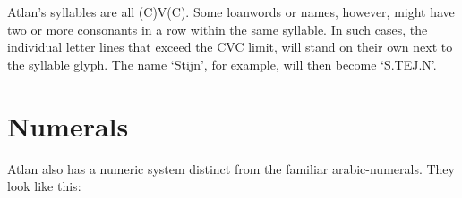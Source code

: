 Atlan’s syllables are all (C)V(C). Some loanwords or names, however, might have two or more consonants in a row within the same syllable. In such cases, the individual letter lines that exceed the CVC limit, will stand on their own next to the syllable glyph. The name ‘Stijn’, for example, will then become ‘S.TEJ.N’. 

\section{Numerals}

Atlan also has a numeric system distinct from the familiar arabic-numerals. They look like this:

\setlength{\columnsep}{10pt}

